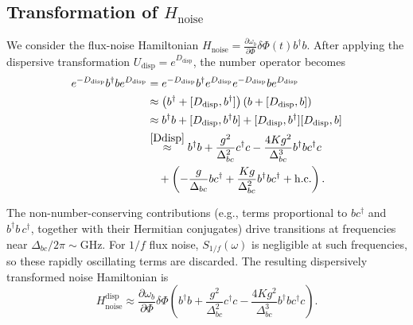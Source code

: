 \subsection{Transformation of $H_{\text{noise}}$}
\label{Hnoise_transfer}
We consider the flux-noise Hamiltonian
$H_{\text{noise}} = \frac{\partial \omega_b}{\partial \Phi} \delta \Phi(t) b^\dagger b$.
After applying the dispersive transformation $U_{\text{disp}} = e^{D_{\text{disp}}}$, the number operator becomes
\begin{align}
    e^{-D_{\text{disp}}} b^\dagger b e^{D_{\text{disp}}} &= e^{-D_{\text{disp}}} b^\dagger e^{D_{\text{disp}}} e^{-D_{\text{disp}}} b e^{D_{\text{disp}}} \nonumber \\
    &\approx \left( b^\dagger + [D_{\text{disp}}, b^\dagger] \right) \left( b + [D_{\text{disp}}, b] \right) \nonumber \\
    &\approx b^\dagger b + [D_{\text{disp}}, b^\dagger b] + [D_{\text{disp}}, b^\dagger][D_{\text{disp}}, b] \nonumber \\
    &\overset{\eqref{Ddisp}}{\approx} b^\dagger b + \frac{g^2}{\Delta_{bc}^2} c^\dagger c - \frac{4Kg^2}{\Delta_{bc}^3} b^\dagger b c^\dagger c \nonumber \\
    &\quad + \left( -\frac{g}{\Delta_{bc}} b c^\dagger + \frac{Kg}{\Delta_{bc}^2} b^\dagger b c^\dagger + \text{h.c.} \right).
\end{align}

The non-number-conserving contributions (e.g., terms proportional to $b c^\dagger$ and $b^\dagger b\,c^\dagger$, together with their Hermitian conjugates) drive transitions at frequencies near $\Delta_{bc}/2\pi\sim\mathrm{GHz}$. For $1/f$ flux noise, $S_{1/f}(\omega)$ is negligible at such frequencies, so these rapidly oscillating terms are discarded. The resulting dispersively transformed noise Hamiltonian is
\begin{equation}
    H_{\text{noise}}^{\text{disp}} \approx \frac{\partial \omega_b}{\partial \Phi} \delta \Phi \left( b^\dagger b + \frac{g^2}{\Delta_{bc}^2} c^\dagger c - \frac{4Kg^2}{\Delta_{bc}^3} b^\dagger b c^\dagger c \right).
\end{equation}

